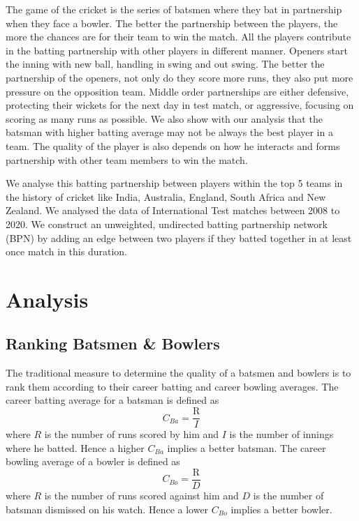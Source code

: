 \documentclass{article}
\begin{document}
The game of the cricket is the series of batsmen where they bat in partnership when they face a bowler. The better the partnership between the players, the more the chances are for their team to win the match. All the players contribute in the batting partnership with other players in different manner. Openers start the inning with new ball, handling in swing and out swing. The better the partnership of the openers, not only do they score more runs, they also put more pressure on the opposition team. Middle order partnerships are either defensive, protecting their wickets for the next day in test match, or aggressive, focusing on scoring as many runs as possible. We also show with our analysis that the batsman with higher batting average may not be always the best player in a team. The quality of the player is also depends on how he interacts and forms partnership with other team members to win the match.

We analyse this batting partnership between players within the top 5 teams in the history of cricket like India, Australia, England, South Africa and New Zealand. We analysed the data of International Test matches between 2008 to 2020. We construct an unweighted, undirected batting partnership network (BPN) by adding an edge between two players if they batted together in at least once match in this duration.

\newpage
\section{Analysis}
\subsection{Ranking Batsmen \& Bowlers}
The traditional measure to determine the quality of a batsmen and bowlers is to rank them according to their career batting and career bowling averages. The career batting average for a batsman is defined as $$C_{Ba} = \frac{\mathrm{R}}{I}$$ where $R$ is the number of runs scored by him and $I$ is the number of innings where he batted. Hence a higher $C_{Ba}$ implies a better batsman. The career bowling average of a bowler is defined as $$C_{Bo} = \frac{\mathrm{R}}{D}$$ where $R$ is the number of runs scored against him and $D$ is the number of batsman dismissed on his watch. Hence a lower $C_{Bo}$ implies a better bowler.
\end{document}
